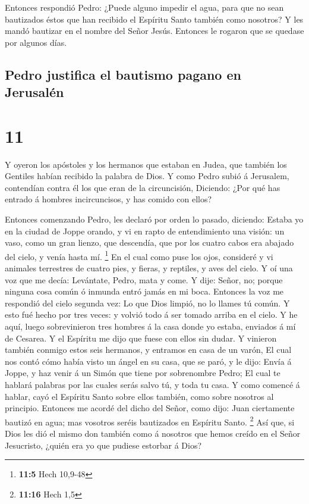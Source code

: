  Entonces respondió Pedro: ¿Puede alguno impedir el agua,
para que no sean bautizados éstos que han recibido el Espíritu Santo
también como nosotros?  Y les mandó bautizar en el nombre
del Señor Jesús. Entonces le rogaron que se quedase por algunos días.

\hypertarget{pedro-justifica-el-bautismo-pagano-en-jerusaluxe9n}{%
\subsection{Pedro justifica el bautismo pagano en
Jerusalén}\label{pedro-justifica-el-bautismo-pagano-en-jerusaluxe9n}}

\hypertarget{section-10}{%
\section{11}\label{section-10}}

 Y oyeron los apóstoles y los hermanos que estaban en
Judea, que también los Gentiles habían recibido la palabra de Dios.
 Y como Pedro subió á Jerusalem, contendían contra él los
que eran de la circuncisión,  Diciendo: ¿Por qué has
entrado á hombres incircuncisos, y has comido con ellos?

 Entonces comenzando Pedro, les declaró por orden lo
pasado, diciendo:  Estaba yo en la ciudad de Joppe orando,
y vi en rapto de entendimiento una visión: un vaso, como un gran lienzo,
que descendía, que por los cuatro cabos era abajado del cielo, y venía
hasta mí. \footnote{\textbf{11:5} Hech 10,9-48}  En el
cual como puse los ojos, consideré y vi animales terrestres de cuatro
pies, y fieras, y reptiles, y aves del cielo.  Y oí una
voz que me decía: Levántate, Pedro, mata y come.  Y dije:
Señor, no; porque ninguna cosa común ó inmunda entró jamás en mi boca.
 Entonces la voz me respondió del cielo segunda vez: Lo
que Dios limpió, no lo llames tú común.  Y esto fué hecho
por tres veces: y volvió todo á ser tomado arriba en el cielo.
 Y he aquí, luego sobrevinieron tres hombres á la casa
donde yo estaba, enviados á mí de Cesarea.  Y el Espíritu
me dijo que fuese con ellos sin dudar. Y vinieron también conmigo estos
seis hermanos, y entramos en casa de un varón,  El cual
nos contó cómo había visto un ángel en su casa, que se paró, y le dijo:
Envía á Joppe, y haz venir á un Simón que tiene por sobrenombre Pedro;
 El cual te hablará palabras por las cuales serás salvo
tú, y toda tu casa.  Y como comencé á hablar, cayó el
Espíritu Santo sobre ellos también, como sobre nosotros al principio.
 Entonces me acordé del dicho del Señor, como dijo: Juan
ciertamente bautizó en agua; mas vosotros seréis bautizados en Espíritu
Santo. \footnote{\textbf{11:16} Hech 1,5}  Así que, si
Dios les dió el mismo don también como á nosotros que hemos creído en el
Señor Jesucristo, ¿quién era yo que pudiese estorbar á Dios?

